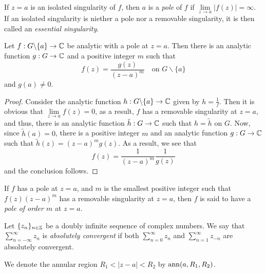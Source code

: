 \begin{definition}
    If $z = a$ is an isolated singularity of $f$, then $a$ is a \textit{pole} of $f$ if $\lim\limits_{z\to a}|f(z)| = \infty$. If an isolated singularity is niether a pole nor a removable singularity, it is then called an \textit{essential singularity}.
\end{definition}

\begin{theorem}
    Let $f: G\backslash\{a\}\to\mathbb{C}$ be analytic with a pole at $z = a$. Then there is an analytic function $g:G\to\mathbb{C}$ and a positive integer $m$ such that 
    \begin{equation*}
        f(z) = \frac{g(z)}{(z - a)^m}\quad\text{on $G\backslash\{a\}$}
    \end{equation*}
    and $g(a)\ne 0$.
\end{theorem}
\begin{proof}
    Consider the analytic function $h:G\backslash\{a\}\to\mathbb{C}$ given by $h = \frac{1}{f}$. Then it is obvious that $\lim\limits_{z\to a}f(z) = 0$, as a result, $f$ has a removable singularity at $z = a$, and thus, there is an analytic function $\tilde h: G\to\mathbb{C}$ such that $h = \tilde h$ on $G$. Now, since $\tilde h(a) = 0$, there is a positive integer $m$ and an analytic function $g:G\to\mathbb{C}$ such that $\tilde h(z) = (z - a)^m g(z)$. As a result, we see that 
    \begin{equation*}
        f(z) = \frac{1}{(z - a)^m}\frac{1}{g(z)}
    \end{equation*}
    and the conclusion follows.
\end{proof}

\begin{definition}
    If $f$ has a pole at $z = a$, and $m$ is the smallest positive integer such that $f(z)(z - a)^m$ has a removable singularity at $z = a$, then $f$ is said to have a \textit{pole of order $m$} at $z = a$.
\end{definition}

\begin{definition}
    Let $\{z_n\}_{n\in\mathbb{Z}}$ be a doubly infinite sequence of complex numbers. We say that $\sum\limits_{n = -\infty}^\infty z_n$ is \textit{absolutely convergent} if both $\sum\limits_{n = 0}^\infty z_n$ and $\sum\limits_{n = 1}^\infty z_{-n}$ are absolutely convergent.
\end{definition}

We denote the annular region $R_1 < |z - a| < R_2$ by $\operatorname{ann}(a,R_1,R_2)$.

